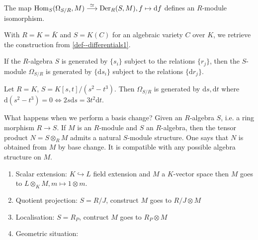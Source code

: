 \documentclass[a4paper,11pt]{article}
\begin{document}
				\begin{cor}
					The map $\operatorname{Hom}_S(\Omega_{S/R},M)\overset{\simeq}{\longrightarrow}\operatorname{Der}_R(S,M),f\mapsto \mathrm{d}f$ defines an $R$-module isomorphism.
				\end{cor}

				\begin{eg}
					With $R=K=\bar{K}$ and $S=K(C)$ for an algebraic variety $C$ over $K$, we retrieve the construction from \autoref{def--differentials1}.
				\end{eg}

				\begin{prop}
					If the $R$-algebra $S$ is generated by $\{s_i\}$ subject to the relations $\{r_j\}$, then the $S$-module $\Omega_{S/R}$ is generated by $\{\mathrm{d}s_i\}$ subject to the relations $\{\mathrm{d}r_j\}$.
				\end{prop}

				\begin{eg}
					Let $R=K$, $S=K[s,t]/(s^2-t^3)$. Then $\Omega_{S/R}$ is generated by $\mathrm{d}s,\mathrm{d}t$ where $\mathrm{d}(s^2-t^3)=0\Longleftrightarrow 2s\mathrm{d}s=3t^2\mathrm{d}t$.
				\end{eg}

				What happens when we perform a basis change? Given an $R$-algebra $S$, i.e. a ring morphism $R\rightarrow S$. If $M$ is an $R$-module and $S$ an $R$-algebra, then the tensor product $N=S\otimes_RM$ admits a natural $S$-module structure. One says that $N$ is obtained from $M$ by base change. It is compatible with any possible algebra structure on $M$.

				\begin{eg}
					\begin{enumerate}
						\item Scalar extension: $K\hookrightarrow L$ field extension and $M$ a $K$-vector space then $M$ goes to  $L\otimes_KM, m\mapsto1\otimes m$.
						\item Quotient projection: $S=R/J$, construct $M$ goes to $R/J\otimes M$
						\item Localisation: $S=R_P$, contruct $M$ goes to $R_P\otimes M$
						\item Geometric situation: 
						\begin{center}
						\end{center}
					\end{enumerate}
				\end{eg}
\end{document}
